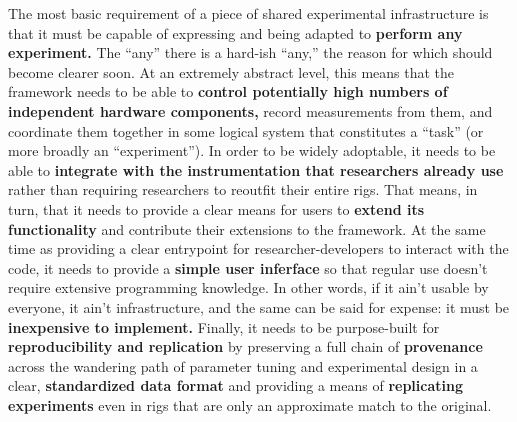 \documentclass[11pt]{article}
\begin{document}
\begin{multicols}{2}
The most basic requirement of a piece of shared experimental
infrastructure is that it must be capable of expressing and being
adapted to \textbf{perform any experiment.} The ``any'' there is a
hard-ish ``any,'' the reason for which should become clearer soon. At an
extremely abstract level, this means that the framework needs to be able
to \textbf{control potentially high numbers of independent hardware
components,} record measurements from them, and coordinate them together
in some logical system that constitutes a ``task'' (or more broadly an
``experiment''). In order to be widely adoptable, it needs to be able to
\textbf{integrate with the instrumentation that researchers already use}
rather than requiring researchers to reoutfit their entire rigs. That
means, in turn, that it needs to provide a clear means for users to
\textbf{extend its functionality} and contribute their extensions to the
framework. At the same time as providing a clear entrypoint for
researcher-developers to interact with the code, it needs to provide a
\textbf{simple user inferface} so that regular use doesn't require
extensive programming knowledge. In other words, if it ain't usable by
everyone, it ain't infrastructure, and the same can be said for expense:
it must be \textbf{inexpensive to implement.} Finally, it needs to be
purpose-built for \textbf{reproducibility and replication} by preserving
a full chain of \textbf{provenance} across the wandering path of
parameter tuning and experimental design in a clear,
\textbf{standardized data format} and providing a means of
\textbf{replicating experiments} even in rigs that are only an
approximate match to the original.


\end{multicols}
\end{document}
